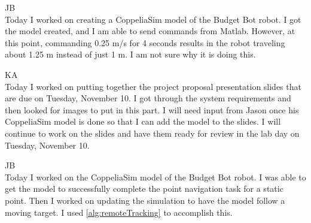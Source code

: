 \documentclass[fontsize=11pt, %
                             paper=letter, %
                             openany, %
                             captions=tableheading,
                             index=totoc,
                             hyperref]{labbook}
\begin{document}
\begin{addmargin}[0cm]{0cm}


JB\\
Today I worked on creating a CoppeliaSim model of the Budget Bot robot. I got the model created, and I am able to send commands from Matlab. However, at this point, commanding 0.25 m/s for 4 seconds results in the robot traveling about 1.25 m instead of just 1 m. I am not sure why it is doing this.

\vspace*{12pt}
KA\\
Today I worked on putting together the project proposal presentation slides that are due on Tuesday, November 10. I got through the system requirements and then looked for images to put in this part. I will need input from Jason once his CoppeliaSim model is done so that I can add the model to the slides. I will continue to work on the slides and have them ready for review in the lab day on Tuesday, November 10. 



JB\\
Today I worked on the CoppeliaSim model of the Budget Bot robot. I was able to get the model to successfully complete the point navigation task for a static point. Then I worked on updating the simulation to have the model follow a moving target. I used \autoref{alg:remoteTracking} to accomplish this.


\end{addmargin}
\end{document}

